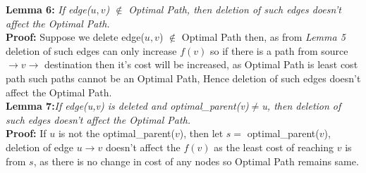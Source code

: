 \documentclass[a4paper]{article}
\begin{document}
\textbf{Lemma 6:} \textit{If edge($u,v$) $\notin$ Optimal Path, then deletion of such edges doesn't affect the Optimal Path.}\\
\textbf{Proof:} Suppose we delete edge($u,v$) $\notin$ Optimal Path then, as from \textit{Lemma 5} deletion of such edges can only increase $f(v)$ so if there is a path from source $\rightarrow v \rightarrow$ destination then it's cost will be increased, as Optimal Path is least cost path such paths cannot be an Optimal Path, Hence deletion of such edges doesn't affect the Optimal Path.\\

\textbf{Lemma 7:}\textit{If edge(u,v) is deleted and optimal\_parent(v)$\neq$u, then deletion of such edges doesn't affect the Optimal Path.}\\
\textbf{Proof:} If $u$ is  not the optimal\_parent($v$), then let $s =$ optimal\_parent($v$), deletion of edge $u \rightarrow v$ doesn't affect the $f(v)$ as the least cost of reaching $v$ is from $s$, as there is no change in cost of any nodes so Optimal Path remains same.\\
\end{document}

